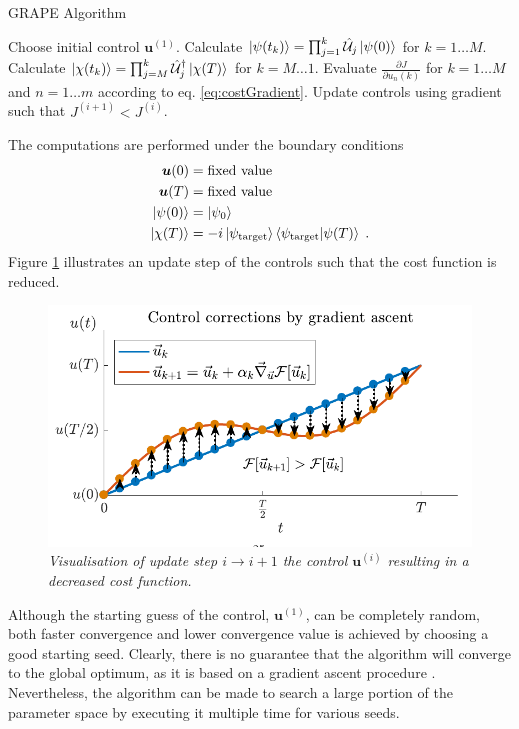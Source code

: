 \begin{algorithm}
\begin{algorithmic}
\caption{GRAPE Algorithm}
\State Choose initial control $\boldsymbol{u}^{(1)}$.
	\State Calculate $\ket{\psi (t_k)} = \prod_{j=1}^{k} \hat{\mathcal{U}}_j \ket{\psi (0)}$ for $k = 1 \ldots M$.
	\State Calculate $\ket{\chi (t_k)} = \prod_{j=M}^{k} \hat{\mathcal{U}}_{j}^{\dag} \ket{\chi (T)}$ for $k = M \ldots 1$. 
	\State Evaluate $\frac{\partial J}{\partial u_n (k)}$ for $k = 1 \ldots M$ and $n = 1 \ldots m$ according to eq. \eqref{eq:costGradient}.
	\State Update controls using gradient such that $J^{(i + 1)} < J^{(i)}$. 
\EndWhile
\end{algorithmic}
\end{algorithm}
The computations are performed under the boundary conditions
\begin{align}
	\boldsymbol{u}(0) &= \text{fixed value} \label{eq:firstBound} \\
	\boldsymbol{u}(T) &= \text{fixed value} \\
	\ket{\psi (0)} &= \ket{\psi_0} \\
	\ket{\chi (T)} &= -i \ket{\psi_{\mathrm{target}}} \braket{\psi_{\mathrm{target}} | \psi (T)} \; .  \label{eq:lastBound}
\end{align}
Figure \ref{fig:ControlUpdate} illustrates an update step of the controls such that the cost function is reduced.
\begin{figure}[!h]
	\centering
	\includegraphics[width=0.7\columnwidth]{Figures/ControlUpdate.pdf} 
	\caption{ \textit{Visualisation of update step $i \to i+1$ the control $\boldsymbol{u}^{(i)}$ resulting in a decreased cost function.}}
	\label{fig:ControlUpdate} 
\end{figure} 
Although the starting guess of the control, $\boldsymbol{u}^{(1)}$, can be completely random, both faster convergence and lower convergence value is achieved by choosing a good starting seed. Clearly, there is no guarantee that the algorithm will converge to the global optimum, as it is based on a gradient ascent procedure \cite{Khaneja2005}. Nevertheless, the algorithm can be made to search a large portion of the parameter space by executing it multiple time for various seeds.  


